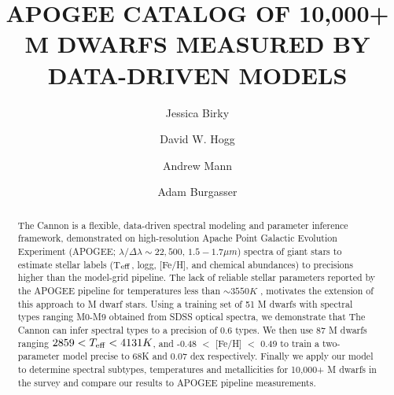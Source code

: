 \documentclass[modern]{aastex62}
\begin{document}
\title{APOGEE CATALOG OF 10,000+ M DWARFS MEASURED BY DATA-DRIVEN MODELS}


\author[0000-0002-7961-6881]{Jessica Birky}

\author[0000-0003-2866-9403]{David W. Hogg}

\author[0000-0003-3654-1602]{Andrew Mann}

\author[0000-0002-6523-9536]{Adam Burgasser}

\begin{abstract}

The Cannon \citep{Ness:2015} is a flexible, data-driven spectral modeling and parameter inference framework, demonstrated on high-resolution Apache Point Galactic Evolution Experiment (APOGEE; $\lambda/\Delta\lambda\sim22,500$, $1.5-1.7 \mu m$) spectra of giant stars to estimate stellar labels (T$_{\rm eff}$, logg, [Fe/H], and chemical abundances) to precisions higher than the model-grid pipeline. The lack of reliable stellar parameters reported by the APOGEE pipeline for temperatures less than $\sim3550K$ \citep{Schmidt:2016}, motivates the extension of this approach to M dwarf stars. Using a training set of 51 M dwarfs with spectral types ranging M0-M9 obtained from SDSS optical spectra, we demonstrate that The Cannon can infer spectral types to a precision of 0.6 types. We then use 87 M dwarfs ranging $2859 < T_{\rm eff} < 4131K$, and -0.48 $<$ [Fe/H] $<$ 0.49 to train a two-parameter model precise to 68K and 0.07 dex respectively. Finally we apply our model to determine spectral subtypes, temperatures and metallicities for 10,000+ M dwarfs in the survey and compare our results to APOGEE pipeline measurements.

\end{abstract}
\end{document}
